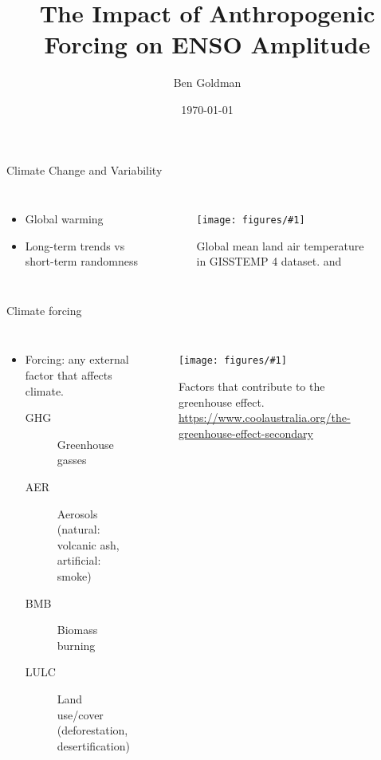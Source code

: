 \documentclass{beamer}
\title{The Impact of Anthropogenic Forcing on ENSO Amplitude}
\author{Ben Goldman}
\date{\today}
\newcommand{\myfig}[3]{
  \begin{figure}
    \centering
    \texttt{[image: figures/\#1]}
    \caption{#2}
    \label{fig:#3}
  \end{figure}
}
\begin{document}
\maketitle

\begin{frame}{Climate Change and Variability}
  \begin{columns}
    \begin{itemize}
    \item Global warming
    \item Long-term trends vs short-term randomness
    \end{itemize}
    \myfig{intro_fig_3.pdf}{Global mean land air temperature in GISSTEMP 4 dataset. \citep{gistemp2019giss} and \citep{lenssen2019improvements}}{woohoo}
  \end{columns}
\end{frame}

\begin{frame}{Climate forcing}
  \begin{columns}
    \begin{itemize}
    \item \alert{Forcing}: any external factor that affects climate.
      \begin{description}
      \item[\alert{GHG}] Greenhouse gasses
      \item[\alert{AER}] Aerosols (natural: volcanic ash, artificial: smoke)
      \item[\alert{BMB}] Biomass burning
      \item[\alert{LULC}] Land use/cover (deforestation, desertification)
      \end{description}
    \end{itemize}
    \myfig{greenhouse_Effect.jpg}{Factors that contribute to the greenhouse effect. \url{https://www.coolaustralia.org/the-greenhouse-effect-secondary}}{this}
  \end{columns}
\end{frame}
\end{document}
